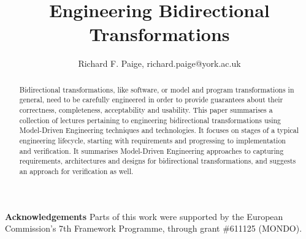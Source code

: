 \documentclass[runningheads,a4paper]{llncs}
\begin{document}
\title{Engineering Bidirectional Transformations}

\author{
Richard F. Paige, richard.paige@york.ac.uk}
%

\maketitle

\begin{abstract}
Bidirectional transformations, like software, or model and program transformations in general, need to be carefully engineered in order to provide guarantees about their correctness, completeness, acceptability and usability. This paper summarises a collection of lectures pertaining to engineering bidirectional transformations using Model-Driven Engineering techniques and technologies. It focuses on stages of a typical engineering lifecycle, starting with requirements and progressing to implementation and verification. It summarises Model-Driven Engineering approaches to capturing requirements, architectures and designs for bidirectional transformations, and suggests an approach for verification as well. 
\end{abstract}













\paragraph*{}\textbf{Acknowledgements} Parts of this work were supported by the European Commission's 7th Framework Programme, through grant \#611125 (MONDO).


\end{document}
